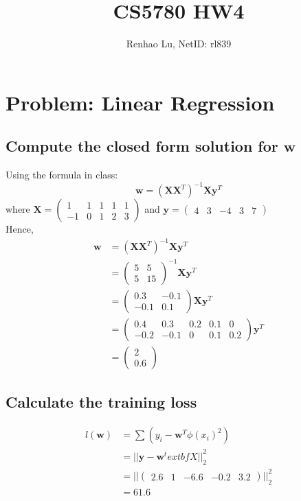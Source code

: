 \documentclass{article}
\title{CS5780 HW4}
\author{Renhao Lu, NetID: rl839}
\begin{document}
	\maketitle
	
	\section{Problem: Linear Regression}
	\subsection{Compute the closed form solution for $\textbf{w}$}
	Using the formula in class:
	\[
	\textbf{w} = 
		(\textbf{X} \textbf{X}^T) ^{-1}
		\textbf{X}
			\textbf{y}^T
	\]
	where $\textbf{X}=\begin{pmatrix} 1 & 1 & 1 & 1 & 1 \\ -1 & 0 & 1 & 2 & 3\end{pmatrix}$ and  $\textbf{y}=\begin{pmatrix} 4 & 3 & -4& 3 & 7 \end{pmatrix}$\\
	Hence,
	\[\begin{split}
		\textbf{w}&=(\textbf{X}\textbf{X}^T)^{-1}\textbf{X}\textbf{y}^T\\
		&=\begin{pmatrix} 5 & 5 \\ 5 & 15\end{pmatrix}^{-1}\textbf{X}\textbf{y}^T\\
		&=\begin{pmatrix} 0.3 & -0.1 \\ -0.1 & 0.1\end{pmatrix}\textbf{X}\textbf{y}^T\\
		&=\begin{pmatrix} 0.4 & 0.3 & 0.2 & 0.1 & 0 \\ -0.2 & -0.1 & 0 & 0.1 & 0.2\end{pmatrix}\textbf{y}^T\\
		&=\begin{pmatrix} 2 \\ 0.6\end{pmatrix}
	\end{split}\]
	
	\subsection{Calculate the training loss}
	\[
		\begin{split}
			l(\textbf{w})&=\sum (y_i-\textbf{w}^T\phi(x_i)^2)\\
			&={||\textbf{y}-\textbf{w}^textbf{X}||}_2^2\\
			&={||\begin{pmatrix} 2.6 & 1 & -6.6 & -0.2 & 3.2 \end{pmatrix}||}_2^2\\
			&=61.6
		\end{split}
	\]
	
\end{document}

